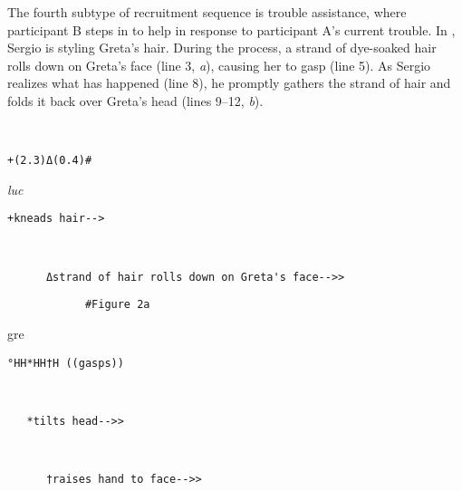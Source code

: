 \documentclass[output=paper,modfonts]{langscibook}
\begin{document}
The fourth subtype of recruitment sequence is trouble assistance, where participant B steps in to help in response to participant A's current trouble. In , Sergio is styling Greta's hair. During the process, a strand of dye-soaked hair rolls down on Greta's face (line 3, \textit{a}), causing her to gasp (line 5). As Sergio realizes what has happened (line 8), he promptly gathers the strand of hair and folds it back over Greta's head (lines 9--12, \textit{b}).

\vspace{2mm}
%
\begin{transbox}{1}{~}
\begin{verbatim}
+(2.3)Δ(0.4)#
\end{verbatim}
\end{transbox}
%
\begin{transbox}{2}{\textit{luc}}
\begin{verbatim}
+kneads hair-->
\end{verbatim}
\end{transbox}
%
\begin{transbox}{3}{~}
\begin{verbatim}
      Δstrand of hair rolls down on Greta's face-->>
\end{verbatim}
\end{transbox}
%
\begin{transbox}{4}{\fig}
\begin{verbatim}
            #Figure 2a
\end{verbatim}
\end{transbox}
%
\begin{mdframednoverticalspace}[style=firstfoc]
\begin{transbox}{5}{gre}
\begin{verbatim}
°HH*HH†H ((gasps))
\end{verbatim}
\end{transbox}
\end{mdframednoverticalspace}
%
\begin{transbox}{6}{~}
\begin{verbatim}
   *tilts head-->>
\end{verbatim}
\end{transbox}
%
\begin{transbox}{7}{~}
\begin{verbatim}
      †raises hand to face-->>
\end{verbatim}
\end{transbox}
\end{document}
